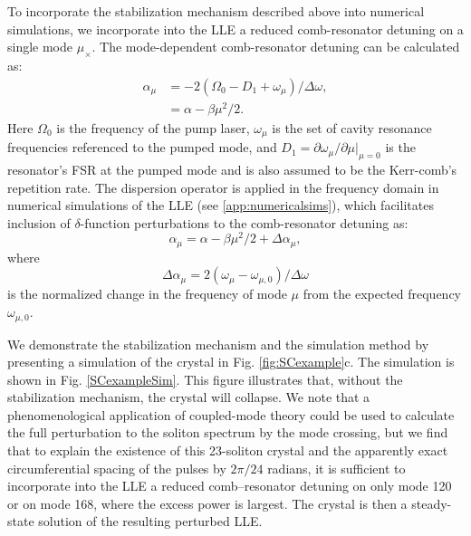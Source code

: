 To incorporate the stabilization mechanism described above into numerical simulations, we incorporate into the LLE a reduced comb-resonator detuning on a single mode $\mu_\times$. The mode-dependent comb-resonator detuning can be calculated as:
\begin{align}
\alpha_\mu&=-2(\Omega_0-D_1+\omega_\mu)/\Delta\omega,\\
&=\alpha-\beta\mu^2/2.
\end{align}
Here $\Omega_0$ is the frequency of the pump laser, $\omega_\mu$ is the set of cavity resonance frequencies referenced to the pumped mode, and $D_1=\partial\omega_\mu/\partial\mu|_{\mu=0}$ is the resonator's FSR at the pumped mode and is also assumed to be the Kerr-comb's repetition rate. The dispersion operator is applied in the frequency domain in numerical simulations of the LLE (see \ref{app:numericalsims}), which facilitates inclusion of $\delta$-function perturbations to the comb-resonator detuning as:
\begin{equation}
\alpha_\mu=\alpha-\beta\mu^2/2+\Delta\alpha_\mu,
\end{equation}
where
\begin{equation}
\Delta\alpha_\mu=2(\omega_\mu-\omega_{\mu,0})/\Delta\omega
\end{equation}
is the normalized change in the frequency of mode $\mu$ from the expected frequency $\omega_{\mu,0}$. 

We demonstrate the stabilization mechanism and the simulation method by presenting a simulation of the crystal in Fig. \ref{fig:SCexample}c. The simulation is shown in Fig. \ref{SCexampleSim}. This figure illustrates that, without the stabilization mechanism, the crystal will collapse. We note that a phenomenological application of coupled-mode theory\cite{Haus1991} could be used to calculate the full perturbation to the soliton spectrum by the mode crossing, but we find that to explain the existence of this 23-soliton crystal and the apparently exact circumferential spacing of the pulses by $2\pi/24$ radians, it is sufficient to incorporate into the LLE a reduced comb–resonator detuning on only mode 120 or on mode 168, where the excess power is largest. The crystal is then a steady-state solution of the resulting perturbed LLE.

